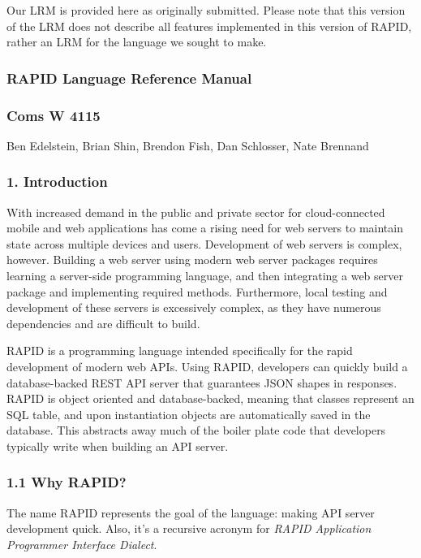 

Our LRM is provided here as originally submitted.  Please note that this
version of the LRM does not describe all features implemented in this version
of RAPID, rather an LRM for the language we sought to make.

\subsubsection{RAPID Language Reference
Manual}\label{rapid-language-reference-manual}

\subsubsection{Coms W 4115}\label{coms-w-4115}

Ben Edelstein, Brian Shin, Brendon Fish, Dan Schlosser, Nate Brennand

\subsubsection{1. Introduction}\label{introduction}

With increased demand in the public and private sector for
cloud-connected mobile and web applications has come a rising need for
web servers to maintain state across multiple devices and users.
Development of web servers is complex, however. Building a web server
using modern web server packages requires learning a server-side
programming language, and then integrating a web server package and
implementing required methods. Furthermore, local testing and
development of these servers is excessively complex, as they have
numerous dependencies and are difficult to build.

RAPID is a programming language intended specifically for the rapid
development of modern web APIs. Using RAPID, developers can quickly
build a database-backed REST API server that guarantees JSON shapes in
responses. RAPID is object oriented and database-backed, meaning that
classes represent an SQL table, and upon instantiation objects are
automatically saved in the database. This abstracts away much of the
boiler plate code that developers typically write when building an API
server.

\subsubsection{1.1 Why RAPID?}\label{why-rapid}

The name RAPID represents the goal of the language: making API server
development quick. Also, it's a recursive acronym for \emph{RAPID
Application Programmer Interface Dialect}.

